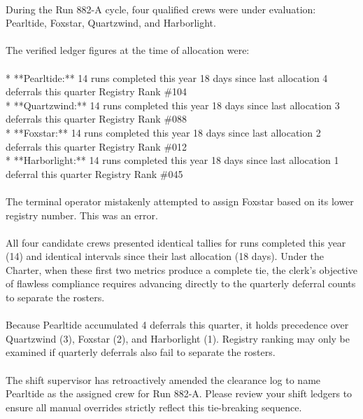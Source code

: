 \begin{exbox}
{  \  \\
  During the Run 882-A cycle, four qualified crews were under evaluation: Pearltide, Foxstar, Quartzwind, and Harborlight. \\
  \  \\
  The verified ledger figures at the time of allocation were: \\
  \  \\
  {}* **Pearltide:** 14 runs completed this year \textbar{} 18 days since last allocation \textbar{} 4 deferrals this quarter \textbar{} Registry Rank \#104 \\
  {}* **Quartzwind:** 14 runs completed this year \textbar{} 18 days since last allocation \textbar{} 3 deferrals this quarter \textbar{} Registry Rank \#088 \\
  {}* **Foxstar:** 14 runs completed this year \textbar{} 18 days since last allocation \textbar{} 2 deferrals this quarter \textbar{} Registry Rank \#012 \\
  {}* **Harborlight:** 14 runs completed this year \textbar{} 18 days since last allocation \textbar{} 1 deferral this quarter \textbar{} Registry Rank \#045 \\
  \  \\
  The terminal operator mistakenly attempted to assign Foxstar based on its lower registry number. This was an error. \\
  \  \\
  All four candidate crews presented identical tallies for runs completed this year (14) and identical intervals since their last allocation (18 days). Under the Charter, when these first two metrics produce a complete tie, the clerk's objective of flawless compliance requires advancing directly to the quarterly deferral counts to separate the rosters. \\
  \  \\
  Because Pearltide accumulated 4 deferrals this quarter, it holds precedence over Quartzwind (3), Foxstar (2), and Harborlight (1). Registry ranking may only be examined if quarterly deferrals also fail to separate the rosters. \\
  \  \\
  The shift supervisor has retroactively amended the clearance log to name Pearltide as the assigned crew for Run 882-A. Please review your shift ledgers to ensure all manual overrides strictly reflect this tie-breaking sequence.}
\end{exbox}
